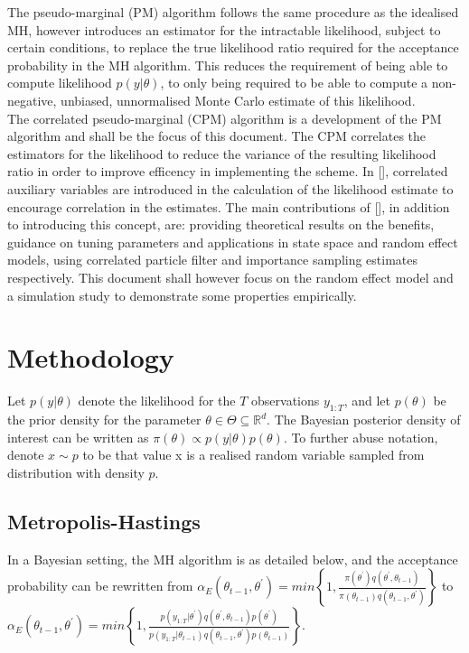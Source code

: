 \documentclass{article}
\begin{document}
The pseudo-marginal (PM) algorithm follows the same procedure as the idealised MH, however introduces an estimator for the intractable likelihood, subject to certain conditions, to replace the true likelihood ratio required for the acceptance probability in the MH algorithm. This reduces the requirement of being able to compute likelihood $p(y|\theta)$, to only being required to be able to compute a non-negative, unbiased, unnormalised Monte Carlo estimate of this likelihood. \\

The correlated pseudo-marginal (CPM) algorithm is a development of the PM algorithm and shall be the focus of this document. The CPM correlates the estimators for the likelihood to reduce the variance of the resulting likelihood ratio in order to improve efficency in implementing the scheme. In [], correlated auxiliary variables are introduced in the calculation of the likelihood estimate to encourage correlation in the estimates. The main contributions of [], in addition to introducing this concept, are: providing theoretical results on the benefits, guidance on tuning parameters and applications in state space and random effect models, using correlated particle filter and importance sampling estimates respectively. This document shall however focus on the random effect model and a simulation study to demonstrate some properties empirically.

  \section{Methodology}
Let $p(y|\theta)$ denote the likelihood for the $T$ observations $y_{1:T}$, and let $p(\theta)$ be the prior density for the parameter $\theta \in \Theta \subseteq \mathbb{R}^{d}$. The Bayesian posterior density of interest can be written as $\pi (\theta) \propto p(y|\theta) p(\theta)$. To further abuse notation, denote $x \sim p$ to be that value x is a realised random variable sampled from distribution with density $p$.\\

\subsection{Metropolis-Hastings}
In a Bayesian setting, the MH algorithm is as detailed below, and the acceptance probability can be rewritten from $\alpha_E(\theta_{t-1}, \theta^\prime) = min\left\{1,  \frac{
                \pi(\theta^\prime) q(\theta^\prime, \theta_{t-1})}
                {\pi(\theta_{t-1}) q(\theta_{t-1}, \theta^\prime)}\right\}$ to
 $ \alpha_E(\theta_{t-1}, \theta^\prime) = min\left\{1,  \frac{
                p(y_{1:T}| \theta^\prime) q(\theta^\prime, \theta_{t-1})p(\theta^\prime)}
                {p(y_{1:T}| \theta_{t-1}) q(\theta_{t-1}, \theta^\prime)p(\theta_{t-1})}
\right\} $.
\end{document}
